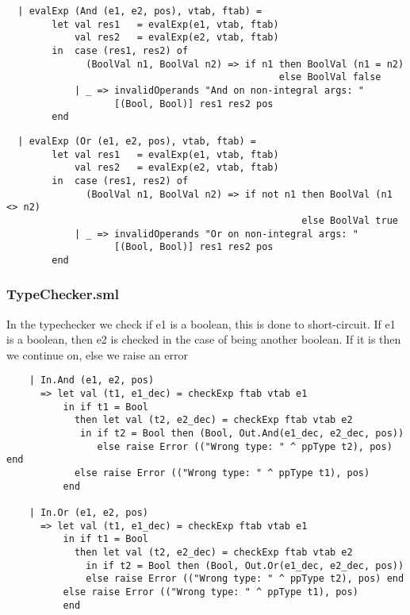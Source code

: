 \documentclass[12pt]{article}
\begin{document}
\begin{verbatim}
  | evalExp (And (e1, e2, pos), vtab, ftab) =
        let val res1   = evalExp(e1, vtab, ftab)
            val res2   = evalExp(e2, vtab, ftab)
        in  case (res1, res2) of
              (BoolVal n1, BoolVal n2) => if n1 then BoolVal (n1 = n2) 
                                                else BoolVal false
            | _ => invalidOperands "And on non-integral args: "
                   [(Bool, Bool)] res1 res2 pos
        end
\end{verbatim}
\clearpage
\begin{verbatim}
  | evalExp (Or (e1, e2, pos), vtab, ftab) =
        let val res1   = evalExp(e1, vtab, ftab)
            val res2   = evalExp(e2, vtab, ftab)
        in  case (res1, res2) of
              (BoolVal n1, BoolVal n2) => if not n1 then BoolVal (n1 <> n2) 
                                                    else BoolVal true
            | _ => invalidOperands "Or on non-integral args: " 
                   [(Bool, Bool)] res1 res2 pos
        end
\end{verbatim}

\subsubsection{TypeChecker.sml}
In the typechecker we check if e1 is a boolean, this is done to short-circuit. If e1 is a boolean, then e2 is checked in the case of being another boolean. If it is then we continue on, else we raise an error


\begin{verbatim}
    | In.And (e1, e2, pos)
      => let val (t1, e1_dec) = checkExp ftab vtab e1
          in if t1 = Bool
            then let val (t2, e2_dec) = checkExp ftab vtab e2
             in if t2 = Bool then (Bool, Out.And(e1_dec, e2_dec, pos))
                else raise Error (("Wrong type: " ^ ppType t2), pos) end
            else raise Error (("Wrong type: " ^ ppType t1), pos)
          end

    | In.Or (e1, e2, pos)
      => let val (t1, e1_dec) = checkExp ftab vtab e1
          in if t1 = Bool
            then let val (t2, e2_dec) = checkExp ftab vtab e2
              in if t2 = Bool then (Bool, Out.Or(e1_dec, e2_dec, pos))
              else raise Error (("Wrong type: " ^ ppType t2), pos) end
          else raise Error (("Wrong type: " ^ ppType t1), pos)
          end
\end{verbatim}
\end{document}
